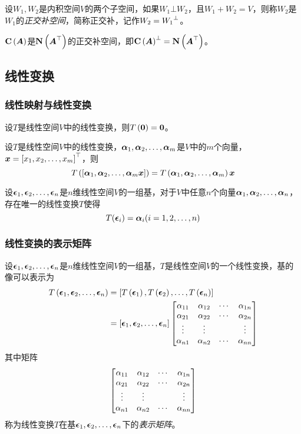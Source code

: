 \documentclass{ctexart}
\begin{document}
\begin{definition}[正交补空间]
    设\(W_1,W_2\)是内积空间\(V\)的两个子空间，如果\(W_1\bot W_2\)，且\(W_1+W_2=V\)，则称\(W_2\)是\(W_1\)的\emph{正交补空间}，简称正交补，记作\(W_2=\ortcom{W_1}\)。
\end{definition}

\begin{infer}
    \(\colsp{\mata}\)是\(\nullsp{\mata^\top}\)的正交补空间，即\(\ortcom{\colsp{\mata}}=\nullsp{\mata^\top}\)。
\end{infer}

\subsection{线性变换}

\subsubsection*{线性映射与线性变换}

\begin{property}
    设\(T\)是线性空间\(V\)中的线性变换，则\(T\mypar{\veczero}=\veczero\)。
\end{property}

\begin{property}
    设\(T\)是线性空间\(V\)中的线性变换，\(\enums{\vecal}{m}\)是\(V\)中的\(m\)个向量，\(\vecx=\mat{\enums{x}{m}}^\top\)，则
    \begin{equation*}
        T\mypar{\mat{\enums{\vecal}{m}\vecx}}=T\mypar{\enums{\vecal}{m}}\vecx
    \end{equation*}
\end{property}

\begin{theorem}
    设\(\enums{\veceps}{n}\)是\(n\)维线性空间\(V\)的一组基，对于\(V\)中任意\(n\)个向量\(\enums{\vecal}{n}\)，存在唯一的线性变换\(T\)使得
    \begin{equation*}
        T(\veceps_i)=\vecal_i(i=1,2,\dots,n)
    \end{equation*}
\end{theorem}

\subsubsection*{线性变换的表示矩阵}

\begin{definition}[表示矩阵]
    设\(\enums{\veceps}{n}\)是\(n\)维线性空间\(V\)的一组基，\(T\)是线性空间\(V\)的一个线性变换，基的像可以表示为
    \begin{align*}
        T\mypar{\enums{\veceps}{n}} & =\mat{T\mypar{\veceps_1},T\mypar{\veceps_2},\dots,T\mypar{\veceps_n}} \\
                                    & =\mat{\enums{\veceps}{n}}\sqmat{bmatrix}{\alpha}{n}
    \end{align*}
    其中矩阵
    \begin{equation*}
        \sqmat{bmatrix}{\alpha}{n}
    \end{equation*}
    称为线性变换\(T\)在基\(\enums{\veceps}{n}\)下的\emph{表示矩阵}。
\end{definition}
\end{document}
